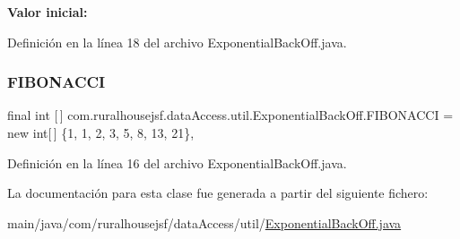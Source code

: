 {\bfseries Valor inicial\+:}
\begin{DoxyCode}{0}
\DoxyCodeLine{    )}

\end{DoxyCode}


Definición en la línea 18 del archivo Exponential\+Back\+Off.\+java.

\mbox{\label{a00156_aa65d2215973a1a6aa71bdbfa80b7cef8}} 
\subsubsection{\texorpdfstring{FIBONACCI}{FIBONACCI}}
{\footnotesize\ttfamily final int \mbox{[}$\,$\mbox{]} com.\+ruralhousejsf.\+data\+Access.\+util.\+Exponential\+Back\+Off.\+F\+I\+B\+O\+N\+A\+C\+CI = new int\mbox{[}$\,$\mbox{]} \{1, 1, 2, 3, 5, 8, 13, 21\}\hspace{0.3cm}{\ttfamily [static]}, {\ttfamily [private]}}



Definición en la línea 16 del archivo Exponential\+Back\+Off.\+java.



La documentación para esta clase fue generada a partir del siguiente fichero\+:\begin{DoxyCompactItemize}
\item 
main/java/com/ruralhousejsf/data\+Access/util/\mbox{\hyperlink{a00023}{Exponential\+Back\+Off.\+java}}\end{DoxyCompactItemize}
